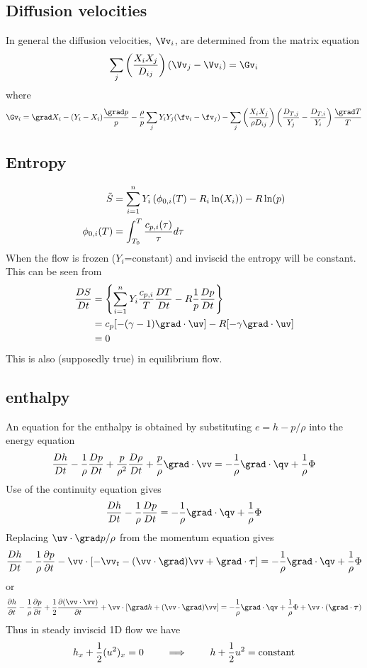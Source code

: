 \documentclass[10pt]{article}
\begin{document}
\subsection{Diffusion velocities}

In general the diffusion velocities, $\Vv_i$, are determined from the matrix equation
\[
    \sum_j \left( {X_i X_j \over D_{ij} }\right) (\Vv_j-\Vv_i) = \Gv_i
\]
where
\[
   \Gv_i = \grad X_i - (Y_i-X_i){\grad p \over p} - {\rho\over p} \sum_j Y_i Y_j (\fv_i-\fv_j)
    - \sum_j\left( {X_i X_j \over \rho D_{ij}}\right)\left( {D_{T,j}\over Y_j} - {D_{T,i}\over Y_i}\right) 
      {\grad T\over T}
\]



\subsection{Entropy}
\begin{align*}
\tilde{S} &= \sum_{i=1}^n Y_i \left(\phi_{0,i} (T) -R_i \ln(X_i)\right) - R \ln(p)  \\
\phi_{0,i} (T) &= \int_{T_0}^T {c_{p,i}(\tau) \over \tau} d\tau 
\end{align*}
When the flow is frozen ($Y_i$=constant) and inviscid the entropy will be constant. This can be
seen from
\begin{align*}
{D S\over Dt} &= \left\{ \sumi Y_i {c_{p,i}\over T}{D T\over Dt}
         - R {1\over p} {D p\over Dt} \right\} \\
 &= c_p [ -(\gamma-1)\grad\cdot\uv] - R [-\gamma\grad\cdot\uv] \\
 & = 0
\end{align*}
This is also (supposedly true) in equilibrium flow.


\subsection{enthalpy}
An equation for the enthalpy is obtained by substituting $e=h-p/\rho$ into the energy equation
\[
   {D h  \over D t}  - {1\over \rho}{D p\over D t} + {p\over\rho^2}{D \rho\over D t}+ {p\over\rho}\grad\cdot\vv
           = -{1\over\rho} \grad\cdot\qv  + {1\over\rho}\Phi   
\]
Use of the continuity equation gives
\[
   {D h  \over D t}  - {1\over \rho}{D p\over D t} 
           = -{1\over\rho} \grad\cdot\qv  + {1\over\rho}\Phi  
\]
Replacing $\uv\cdot\grad p/\rho$ from the momentum equation gives
\[
   {D h  \over D t}  - {1\over \rho}{\partial p\over \partial t} 
         - \vv\cdot\left[ - \vv_t -  (\vv\cdot\grad)\vv + \Div \tauv \right]
           = -{1\over\rho} \grad\cdot\qv  + {1\over\rho}\Phi  
\]
or
\newcommand{\halfo}{{1\over2}}
\begin{equation}
   {\partial h  \over \partial t}  
  - {1\over \rho}{\partial p\over \partial t} 
  + \halfo {\partial (\vv\cdot\vv)\over \partial t}
   + \vv\cdot\left[ \grad h  +  (\vv\cdot\grad)\vv \right]
           = -{1\over\rho} \grad\cdot\qv  + {1\over\rho}\Phi  + \vv\cdot(\Div\tauv)
\end{equation}
Thus in steady inviscid 1D flow we have
\[
     h_x + \halfo (u^2)_x = 0 \qquad \implies\qquad  h+\halfo u^2 = \text{constant}
\]
\end{document}
